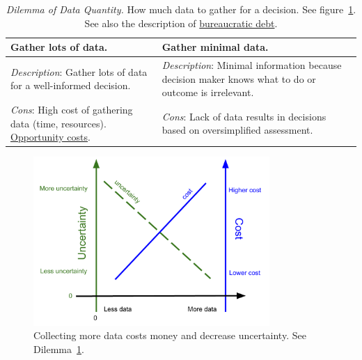 \begin{center}
\begin{table}[H] %
\begin{tabular}{ | m{\dilemmatablewidth}| m{\dilemmatablewidth} | } 
  \hline
  \textbf{Gather lots of data.} &
  \textbf{Gather minimal data.} \\
  \hline
  \textit{Description}: Gather lots of data for a well-informed decision. &
  \textit{Description}: Minimal information because decision maker knows what to do or outcome is irrelevant.  \\  
  \hline
  \textit{Cons}: High cost of gathering data (time, resources). \href{https://en.wikipedia.org/wiki/Opportunity_cost}{Opportunity costs}. & 
  \textit{Cons}: Lack of data results in decisions based on oversimplified assessment. \\
  \hline
\end{tabular}
\caption{
\textit{Dilemma of Data Quantity.}
How much data to gather for a decision. See figure~\ref{fig:data_collection_cost_uncertainty}. See also the description of 
 \hyperref[sec:bureaucratic-debt]{bureaucratic debt}.
}
\label{table:gather_data_lots-vs-little}
\end{table}
\end{center}

\begin{figure}[H] %
        \centering
        \includegraphics[width=0.8\textwidth]{images/cost_and_uncertainty_for_data_collection}
        \caption{Collecting more data costs money and decrease uncertainty. See Dilemma~\ref{table:gather_data_lots-vs-little}.}
        \label{fig:data_collection_cost_uncertainty}
\end{figure}

